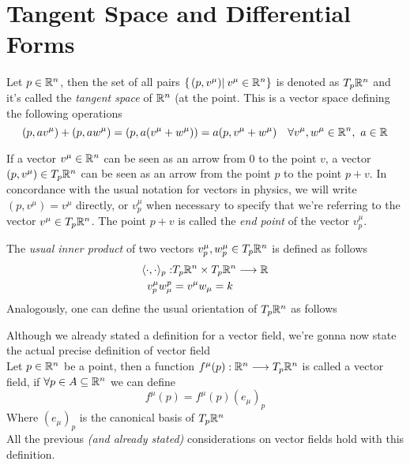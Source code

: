 \documentclass[../complete.tex]{subfiles}
\begin{document}
\section{Tangent Space and Differential Forms}
\begin{dfn}
	Let $p\in\mathbb{R}^n$, then the set of all pairs $\{\left.(p,v^\mu)\right|_{}v^\mu\in\mathbb{R}^n\}$ is denoted as $T_{p}\mathbb{R}^n$ and it's called the \textit{tangent space} of $\mathbb{R}^n$ (at the point. This is a vector space defining the following operations
	\begin{equation*}
		(p,av^\mu)+(p,aw^\mu)=\left(p,a(v^\mu+w^\mu)\right)=a(p,v^\mu+w^\mu)\quad\forall v^\mu,w^\mu\in\mathbb{R}^n,\ a\in\mathbb{R}
	\end{equation*}
\end{dfn}
\begin{rmk}
	If a vector $v^\mu\in\mathbb{R}^n$ can be seen as an arrow from $0$ to the point $v$, a vector $(p,v^\mu)\in T_p\mathbb{R}^n$ can be seen as an arrow from the point $p$ to the point $p+v$. In concordance with the usual notation for vectors in physics, we will write $(p,v^\mu)=v^\mu$ directly, or $v^\mu_p$ when necessary to specify that we're referring to the vector $v^\mu\in T_p\mathbb{R}^n$. The point $p+v$ is called the \textit{end point} of the vector $v^\mu_p$.
\end{rmk}
\begin{dfn}
	The \textit{usual inner product} of two vectors $v^\mu_p,w^\mu_p\in T_p\mathbb{R}^n$ is defined as follows
	\begin{equation}
		\begin{aligned}
			\langle \cdot, \cdot \rangle_p:&T_p\mathbb{R}^n\times T_p\mathbb{R}^n\overset{}{\longrightarrow}\mathbb{R}\\
			v^\mu_pw_\mu^p&=v^\mu w_\mu=k
		\end{aligned}
		\label{eq:tanscalarprod}
	\end{equation}
	Analogously, one can define the usual orientation of $T_p\mathbb{R}^n$ as follows
	\begin{equation*}
		[(e^{\mu_1})_p,\cdots,(e^{\mu_n})_p]
	\end{equation*}
\end{dfn}
\begin{dfn}
	Although we already stated a definition for a vector field, we're gonna now state the actual precise definition of vector field\\
	Let $p\in\mathbb{R}^n$ be a point, then a function $f^\mu(p):\mathbb{R}^n\overset{}{\longrightarrow} T_p\mathbb{R}^n$ is called a vector field, if $\forall p\in A\subseteq\mathbb{R}^n$ we can define
	\begin{equation}
		f^\mu(p)=f^\mu(p)(e_\mu)_p
		\label{eq:correctvectorfield}
	\end{equation}
	Where $(e_\mu)_p$ is the canonical basis of $T_p\mathbb{R}^n$\\
	All the previous \textit{(and already stated)} considerations on vector fields hold with this definition.
\end{dfn}
\end{document}
